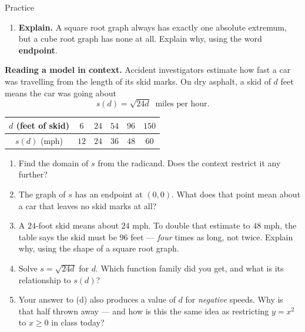 \documentclass[10pt]{article}
\begin{document}
\begin{notesbox}{Practice}
\begin{enumerate}[leftmargin=1.9em, itemsep=12pt]
  \item \textbf{Explain.} A square root graph always has exactly one absolute extremum, but a cube
        root graph has none at all. Explain why, using the word \textbf{endpoint}.
\end{enumerate}
\end{notesbox}

\begin{extensionbox}
\textbf{Reading a model in context.} Accident investigators estimate how fast a car was travelling
from the length of its skid marks. On dry asphalt, a skid of $d$ feet means the car was going about
\[
  s(d) = \sqrt{24d} \ \text{ miles per hour.}
\]
\begin{center}
\renewcommand{\arraystretch}{1.25}
\begin{tabular}{|c|c|c|c|c|c|}
\hline
$d$ (feet of skid) & $6$ & $24$ & $54$ & $96$ & $150$ \\ \hline
$s(d)$ (mph) & $12$ & $24$ & $36$ & $48$ & $60$ \\ \hline
\end{tabular}
\end{center}
\begin{enumerate}[label=(\alph*), leftmargin=1.8em, itemsep=5pt]
  \item Find the domain of $s$ from the radicand. Does the context restrict it any further?
  \item The graph of $s$ has an endpoint at $(0,0)$. What does that point mean about a car that
        leaves no skid marks at all?
  \item A $24$-foot skid means about $24$ mph. To double that estimate to $48$ mph, the table says the
        skid must be $96$ feet --- \emph{four} times as long, not twice. Explain why, using the shape
        of a square root graph.
  \item Solve $s=\sqrt{24d}$ for $d$. Which function family did you get, and what is its relationship
        to $s(d)$?
  \item Your answer to (d) also produces a value of $d$ for \emph{negative} speeds. Why is that half
        thrown away --- and how is this the same idea as restricting $y=x^2$ to $x\ge 0$ in class
        today?
\end{enumerate}
\end{extensionbox}
\end{document}
